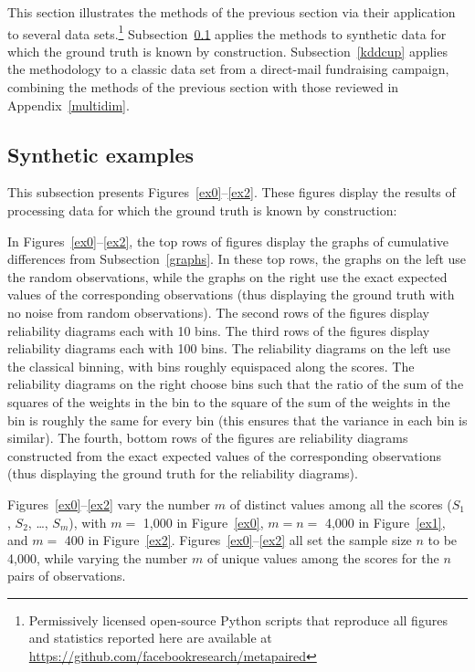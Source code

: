 \documentclass{article}
\begin{document}
This section illustrates the methods of the previous section
via their application to several data sets.\footnote{Permissively licensed
open-source Python scripts that reproduce all figures and statistics
reported here are available at
\url{https://github.com/facebookresearch/metapaired}}
Subsection~\ref{synthetic} applies the methods to synthetic data
for which the ground truth is known by construction.
Subsection~\ref{kddcup} applies the methodology to a classic data set
from a direct-mail fundraising campaign, combining the methods
of the previous section with those reviewed in Appendix~\ref{multidim}.


\subsection{Synthetic examples}
\label{synthetic}

This subsection presents Figures~\ref{ex0}--\ref{ex2}.
These figures display the results of processing data for which the ground truth
is known by construction:

In Figures~\ref{ex0}--\ref{ex2}, the top rows of figures
display the graphs of cumulative differences from Subsection~\ref{graphs}.
In these top rows, the graphs on the left use the random observations,
while the graphs on the right use the exact expected values
of the corresponding observations (thus displaying the ground truth
with no noise from random observations).
The second rows of the figures display reliability diagrams each with 10 bins.
The third rows of the figures display reliability diagrams each with 100 bins.
The reliability diagrams on the left use the classical binning,
with bins roughly equispaced along the scores.
The reliability diagrams on the right choose bins such that the ratio
of the sum of the squares of the weights in the bin
to the square of the sum of the weights in the bin
is roughly the same for every bin (this ensures that the variance
in each bin is similar).
The fourth, bottom rows of the figures are reliability diagrams
constructed from the exact expected values of the corresponding observations
(thus displaying the ground truth for the reliability diagrams).

Figures~\ref{ex0}--\ref{ex2} vary the number $m$ of distinct values
among all the scores ($S_1$, $S_2$, \dots, $S_m$), with $m =$ 1,000
in Figure~\ref{ex0}, $m = n =$ 4,000 in Figure~\ref{ex1},
and $m =$ 400 in Figure~\ref{ex2}. Figures~\ref{ex0}--\ref{ex2}
all set the sample size $n$ to be 4,000, while varying the number $m$
of unique values among the scores for the $n$ pairs of observations.
\end{document}
